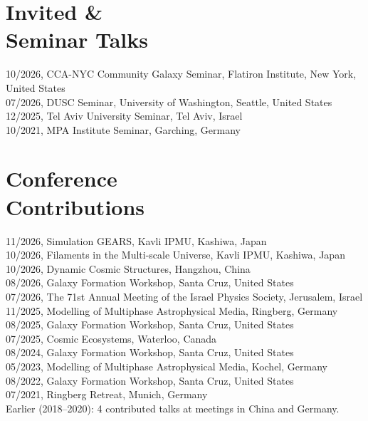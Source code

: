 \documentclass[margin, 10pt]{res} %
\begin{document}
\begin{resume}
\section{Invited \& \\ Seminar Talks}

10/2026, CCA-NYC Community Galaxy Seminar, Flatiron Institute, New York, United States\\
07/2026, DUSC Seminar, University of Washington, Seattle, United States\\
12/2025, Tel Aviv University Seminar, Tel Aviv, Israel\\
10/2021, MPA Institute Seminar, Garching, Germany

\section{Conference \\ Contributions}

11/2026, Simulation GEARS, Kavli IPMU, Kashiwa, Japan\\
10/2026, Filaments in the Multi-scale Universe, Kavli IPMU, Kashiwa, Japan\\
10/2026, Dynamic Cosmic Structures, Hangzhou, China\\
08/2026, Galaxy Formation Workshop, Santa Cruz, United States\\
07/2026, The 71st Annual Meeting of the Israel Physics Society, Jerusalem, Israel\\
11/2025, Modelling of Multiphase Astrophysical Media, Ringberg, Germany\\
08/2025, Galaxy Formation Workshop, Santa Cruz, United States\\
07/2025, Cosmic Ecosystems, Waterloo, Canada\\
08/2024, Galaxy Formation Workshop, Santa Cruz, United States\\
05/2023, Modelling of Multiphase Astrophysical Media, Kochel, Germany\\
08/2022, Galaxy Formation Workshop, Santa Cruz, United States\\
07/2021, Ringberg Retreat, Munich, Germany\\
Earlier (2018--2020): 4 contributed talks at meetings in China and Germany.


\end{resume}
\end{document}
